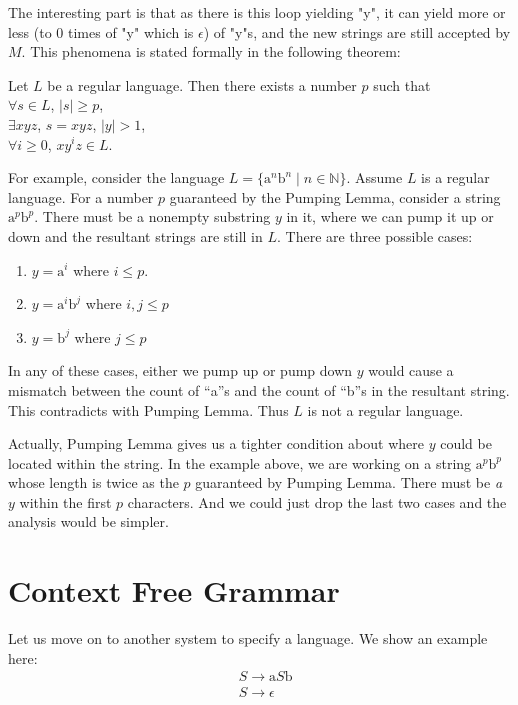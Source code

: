 \documentclass[11pt]{article}
\begin{document}
The interesting part is that as there is this loop yielding "y", it can
yield more or less (to $0$ times of "y" which is $\epsilon$) of "y"s, and
the new strings are still accepted by $M$. This phenomena is stated
formally in the following theorem:
\begin{theorem}
Let $L$ be a regular language. Then there exists a number $p$ such that \\
$\forall s \in L$, $|s| \geq p$, \\
\indent $\exists xyz$, $s = xyz$, $|y| > 1$, \\
\indent\indent $\forall i \geq 0$, $xy^iz \in L$.
\end{theorem}

For example, consider the language $L = \{\mathrm{a}^n\mathrm{b}^n \mid n \in \mathbb{N}\}$.
Assume $L$ is a regular language. For a number $p$ guaranteed by the Pumping
Lemma, consider a string $\mathrm{a}^p\mathrm{b}^p$. There must be a nonempty substring $y$ in
it, where we can pump it up or down and the resultant strings are still in
$L$. There are three possible cases:
\begin{enumerate}
\item $y = \mathrm{a}^i$ where $i \leq p$.
\item $y = \mathrm{a}^i\mathrm{b}^j$ where $i, j \leq p$
\item $y = \mathrm{b}^j$ where $j \leq p$
\end{enumerate}

In any of these cases, either we pump up or pump down $y$ would cause a
mismatch between the count of ``a''s and the count of ``b''s in the resultant
string. This contradicts with Pumping Lemma. Thus $L$ is not a regular
language.

Actually, Pumping Lemma gives us a tighter condition about where $y$ could
be located within the string. In the example above, we are working on a
string $\mathrm{a}^p\mathrm{b}^p$ whose length is twice as the $p$ guaranteed by Pumping
Lemma. There must be \emph{a} $y$ within the first $p$ characters. And we
could just drop the last two cases and the analysis would be simpler.

\section{Context Free Grammar}

Let us move on to another system to specify a language. We show an example
here:
\begin{align*}
&S \rightarrow \mathrm{a}S\mathrm{b} \\
&S \rightarrow \epsilon
\end{align*}
\end{document}
